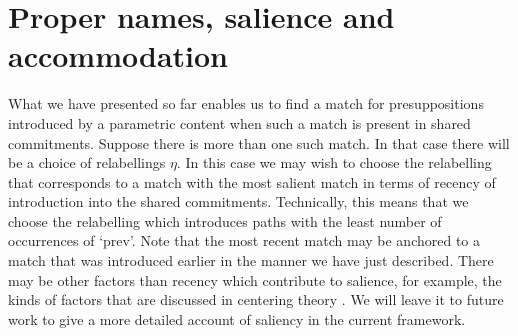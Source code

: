 \section{Proper names, salience and accommodation}
\label{sec:accommodation}

What we have presented so far enables us to find a match for
presuppositions introduced by a parametric content when such a match
is present in shared commitments.  Suppose there is more than one such
match.  In that case there will be a choice of relabellings $\eta$.
In this case we may wish to choose the relabelling that corresponds to
a match with the most salient match in terms of recency of
introduction into the shared commitments.  Technically, this means
that we choose the relabelling which introduces paths with the least
number of occurrences of `prev'.  Note that the most recent match may
be anchored to a match that was introduced earlier in the manner we
have just described.  There may be other factors than recency which
contribute to salience, for example, the kinds of factors that are
discussed in centering theory \citep{JoshiWeinstein1981,GroszJoshiWeinstein1983,GroszJoshiWeinstein1995,WalkerJoshiPrince1998,PoesioStevensonEugenioHitzeman2004}.  We will leave it to future work to give a
more detailed account of saliency in the current framework.

